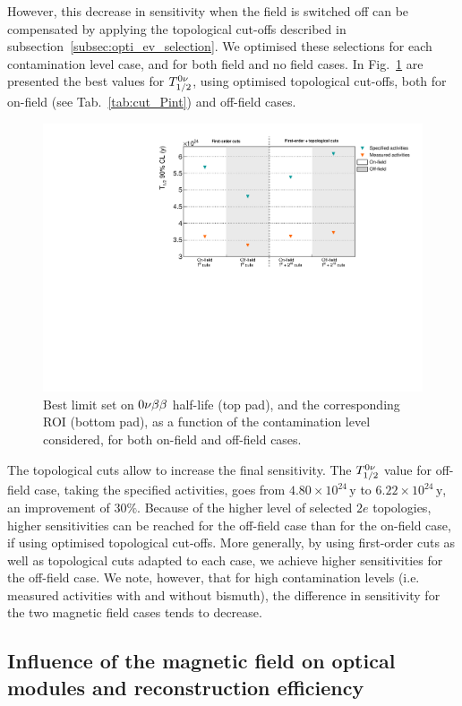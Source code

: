 However, this decrease in sensitivity when the field is switched off can be compensated by applying the topological cut-offs described in subsection~\ref{subsec:opti_ev_selection}.
We optimised these selections for each contamination level case, and for both field and no field cases.
In Fig.~\ref{fig:sensitivity_B} are presented the best values for $T_{1/2}^{0\nu}$, using optimised topological cut-offs, both for on-field (see Tab.~\ref{tab:cut_Pint}) and off-field cases.
\begin{figure}[h]
  \centering
  \includegraphics[width=1.1\textwidth]{Sensitivity/fig_sensitivity/contamination_Se_w_woB.pdf}
  \caption{Best limit set on $0\nu\beta\beta$ half-life (top pad), and the corresponding ROI (bottom pad), as a function of the contamination level considered, for both on-field and off-field cases.
    \label{fig:sensitivity_B}}
\end{figure}
The topological cuts allow to increase the final sensitivity.
The $T_{1/2}^{0\nu}$ value for off-field case, taking the specified activities, goes from $4.80\times 10^{24}\,\text{y}$ to $6.22\times 10^{24}\,\text{y}$, an improvement of $30\%$.
Because of the higher level of selected $2e$ topologies, higher sensitivities can be reached for the off-field case than for the on-field case, if using optimised topological cut-offs.
More generally, by using first-order cuts as well as topological cuts adapted to each case, we achieve higher sensitivities for the off-field case.
We note, however, that for high contamination levels (i.e. measured activities with and without bismuth), the difference in sensitivity for the two magnetic field cases tends to decrease.

\subsection{Influence of the magnetic field on optical modules and reconstruction efficiency}

